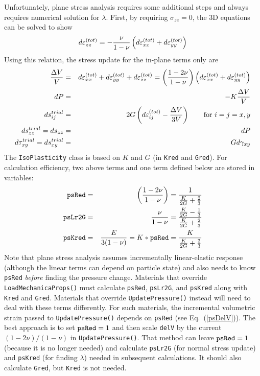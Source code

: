 \documentclass[11pt]{book}
\def\code#1{{\small\tt #1}}
\def\s#1{\sigma_{#1}}
\begin{document}
Unfortunately, plane stress analysis requires some additional steps and always requires numerical solution for $\lambda$. First, by requiring $\s{zz}=0$, the 3D equations can be solved to show
\begin{equation}
         d\varepsilon_{zz}^{(tot)} = - {\nu\over 1-\nu}\left(d\varepsilon_{xx}^{(tot)} + d\varepsilon_{yy}^{(tot)}\right)
\end{equation}
Using this relation, the stress update for the in-plane terms only are
\begin{eqnarray}
       {\Delta V\over V} & = & d\varepsilon_{xx}^{(tot)} + d\varepsilon_{yy}^{(tot)} + d\varepsilon_{zz}^{(tot)}
                             = \left(1-2\nu\over 1-\nu\right)\left(d\varepsilon_{xx}^{(tot)} + d\varepsilon_{yy}^{(tot)}\right)      \label{psDelV} \\
       dP & = & -K {\Delta V\over V} \\
       ds_{ij}^{trial} & = & 2G \left(d\varepsilon_{ij}^{(tot)} - {\Delta V\over 3V}\right)   \qquad {\rm for\ }i=j=x,y \\
       ds_{zz}^{trial} = ds_{zz} & = & dP \\
       d\tau_{xy}^{trial} = ds_{xy}^{trial} & = & G d\gamma_{xy} \\
\end{eqnarray}
The \code{IsoPlasticity} class is based on $K$ and $G$ (in \code{Kred} and \code{Gred}). For calculation efficiency, two above terms and one term defined below are stored in variables:
\begin{eqnarray}
       \code{psRed} & = & \left(1-2\nu\over 1-\nu\right) = {1 \over {K\over 2G} + {2\over 3}} \\
       \code{psLr2G} & = & {\nu\over 1-\nu} ={{K\over 2G} - {1\over 3} \over {K\over 2G} + {2\over 3}} \\
       \code{psKred} & = & {E\over 3(1-\nu)} = K*\code{psRed} = {K \over {K\over 2G} + {2\over 3}}
\end{eqnarray}
Note that plane stress analysis assumes incrementally linear-elastic response (although the linear terms can depend on particle state) and also needs to know \code{psRed}  \emph{before} finding the pressure change. Materials that override \code{LoadMechanicaProps()} must calculate \code{psRed}, \code{psLr2G}, and \code{psKred} along with \code{Kred} and \code{Gred}. Materials that override \code{UpdatePressure()} instead will need to deal with these terms differently. For such materials, the incremental volumetric strain passed to \code{UpdatePressure()} depends on \code{psRed} (see Eq.~(\ref{psDelV})). The best approach is to set $\code{psRed}=1$ and then scale \code{delV} by the current $(1-2\nu)/(1-\nu)$ in \code{UpdatePressure()}. That method can leave $\code{psRed}=1$ (because it is no longer needed) and calculate \code{psLr2G} (for normal stress update) and \code{psKred} (for finding $\lambda$) needed in subsequent calculations. It should also calculate \code{Gred}, but \code{Kred} is not needed.
\end{document}
